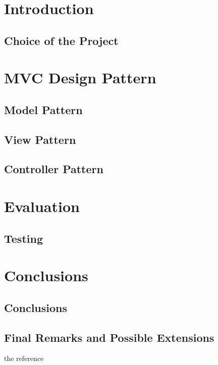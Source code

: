 \documentclass[12pt,letterpaper, onecolumn]{article}
\begin{document}
	\renewcommand{\thepage}{\arabic{page}}
	\setcounter{page}{1}

	\section{Introduction}
	\subsection{Choice of the Project}
		\lipsum
	\section{MVC Design Pattern}
	\subsection{Model Pattern}
	\subsection{View Pattern}
	\subsection{Controller Pattern}
		\lipsum
	\section{Evaluation}
	\subsection{Testing}
		\lipsum
	\section{Conclusions}
	\subsection{Conclusions}
	\subsection{Final Remarks and Possible Extensions}
		\lipsum
	
	\newpage
	\lhead{}
	\rhead{}

	\begin{thebibliography}{1}

	 the reference
	
	\end{thebibliography}
\end{document}
